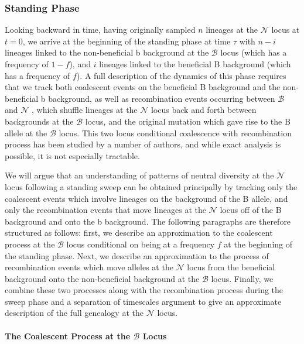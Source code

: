 \documentclass[a4paper,10pt]{article}
\newcommand{\fancyN}{$\mathcal N$ }
\newcommand{\fancyB}{$\mathcal B$ }
\begin{document}



\subsubsection{Standing Phase}
Looking backward in time, having originally sampled $n$ lineages at the \fancyN locus at $t=0$, we arrive at the beginning of the standing phase at time $\tau$ with $n-i$ lineages linked to the non-beneficial b background at the \fancyB locus (which has a frequency of $1-f$), and $i$ lineages linked to the beneficial B background (which has a frequency of $f$). A full description of the dynamics of this phase requires that we track both coalescent events on the beneficial B background and the non-beneficial b background, as well as recombination events occurring between \fancyB and \fancyN, which shuffle lineages at the \fancyN locus back and forth between backgrounds at the \fancyB locus, and the original mutation which gave rise to the B allele at the \fancyB locus. This two locus conditional coalescence with recombination process has been studied by a number of authors, and while exact analysis is possible, it is not especially tractable.

We will argue that an understanding of patterns of neutral diversity at the \fancyN locus following a standing sweep can be obtained principally by tracking only the coalescent events which involve lineages on the background of the B allele, and only the recombination events that move lineages at the \fancyN locus off of the B background and onto the b background. The following paragraphs are therefore structured as follows: first, we describe an approximation to the coalescent process at the \fancyB locus conditional on being at a frequency $f$ at the beginning of the standing phase. Next, we describe an approximation to the process of recombination events which move alleles at the \fancyN locus from the beneficial background onto the non-beneficial background at the \fancyB locus. Finally, we combine these two processes along with the recombination process during the sweep phase and a separation of timescales argument to give an approximate description of the full genealogy at the \fancyN locus.

\paragraph{The Coalescent Process at the \fancyB Locus}
\end{document}

